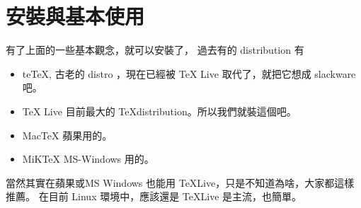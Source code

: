 \chapter{安裝與基本使用}
有了上面的一些基本觀念，就可以安裝了， 過去有的 distribution 有
\begin{itemize}
 \item teTeX, 古老的 distro ，現在已經被 TeX Live 取代了，就把它想成 slackware 吧。
 \item TeX Live 目前最大的 \TeX distribution。所以我們就裝這個吧。
 \item MacTeX 蘋果用的。
 \item MiKTeX MS-Windows 用的。
\end{itemize}
當然其實在蘋果或MS Windows 也能用 \TeX Live，只是不知道為啥，大家都這樣推薦。
在目前 Linux 環境中，應該還是 \TeX Live 是主流，也簡單。

